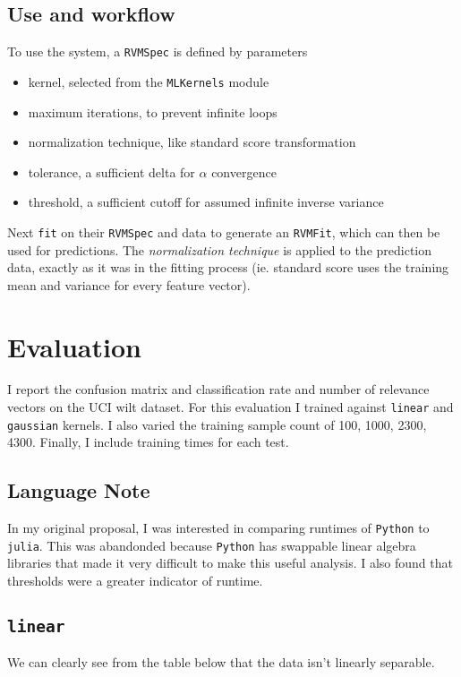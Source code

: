 \documentclass[11pt]{article} %
\def\julia{\texttt{julia}\xspace}
\def\python{\texttt{Python}\xspace}
\def\wilt{UCI wilt dataset\xspace}
\begin{document}
\subsection{Use and workflow}
To use the system, a \texttt{RVMSpec} is defined by parameters
\begin{itemize}
  \setlength\itemsep{0em}
\item kernel, selected from the \texttt{MLKernels} module
\item maximum iterations, to prevent infinite loops
\item normalization technique, like standard score transformation
\item tolerance, a sufficient delta for $\alpha$ convergence
\item threshold, a sufficient cutoff for assumed infinite inverse variance
\end{itemize}

Next \texttt{fit} on their \texttt{RVMSpec} and data to
generate an \texttt{RVMFit}, which can then be used for predictions.
The {\em normalization technique} is applied to the prediction
data, exactly as it was in the fitting process (ie. standard
score uses the training mean and variance for every feature vector).

\newpage
\section{Evaluation}
\def\linear{\texttt{linear}\xspace}
\def\radial{\texttt{radialbasis}\xspace}
\def\gaussian{\texttt{gaussian}\xspace}
I report the confusion matrix and classification rate and number
of relevance vectors on the \wilt. For this evaluation I trained
against \linear and \gaussian kernels. I also varied the
training sample count of 100, 1000, 2300, 4300. Finally, I include
training times for each test.

\subsection{Language Note}
In my original proposal, I was interested in comparing runtimes
of \python to \julia. This was abandonded because \python has
swappable linear algebra libraries that made it very difficult to
make this useful analysis. I also found that thresholds were a
greater indicator of runtime.

\subsection{\linear}
We can clearly see from the table below that the data isn't linearly
separable.
\end{document}
